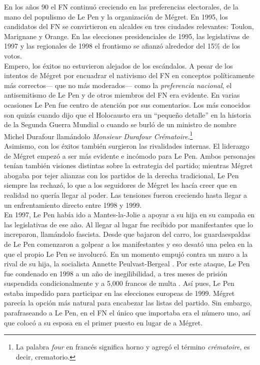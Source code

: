 En los años 90 el FN continuó creciendo en las preferencias electorales, de la mano del populismo de Le Pen y la organización de Mégret. En 1995, los candidatos del FN se convirtieron en alcaldes en tres ciudades relevantes: Toulon, Marignane y Orange. En las elecciones presidenciales de 1995, las legislativas de 1997 y las regionales de 1998 el frontismo se afianzó alrededor del 15\% de los votos.\\

Empero, los éxitos no estuvieron alejados de los escándalos. A pesar de los intentos de Mégret por encuadrar el nativismo del FN en conceptos políticamente más correctos--- que no más moderados--- como la \textit{preferencia nacional}, el antisemitismo de Le Pen y de otros miembros del FN era evidente. En varias ocasiones Le Pen fue centro de atención por sus comentarios. Los más conocidos son quizás cuando dijo que el Holocausto era un ``pequeño detalle'' en la historia de la Segunda Guerra Mundial o cuando se burló de un ministro de nombre Michel Durafour llamándolo \textit{Monsieur Durafour Crématoire}.\footnote{La palabra \textit{four} en francés significa horno y agregó el término \textit{crématoire}, es decir, crematorio.}\\ 

Asimismo, con los éxitos también surgieron las rivalidades internas. El liderazgo de Mégret empezó a ser más evidente e incómodo para Le Pen. Ambos personajes tenían también visiones distintas sobre la estrategia del partido;  mientras Mégret abogaba por tejer alianzas con los partidos de la derecha tradicional, Le Pen siempre las rechazó, lo que a los seguidores de Mégret les hacía creer que en realidad no quería llegar al poder. Las tensiones fueron creciendo hasta llegar a un enfrentamiento directo entre 1998 y 1999.\\ 

En 1997, Le Pen había ido a Mantes-la-Jolie a apoyar a su hija en su campaña en las legislativas de ese año. Al llegar al lugar fue recibido por manifestantes que lo increparon, llamándolo fascista. Desde que bajaron del carro, los guardaespaldas de Le Pen comenzaron a golpear a los manifestantes y eso desató una pelea en la que el propio Le Pen se involucró. En un momento empujó contra un muro a la rival de su hija, la socialista Annette Peulvast-Bergeal \parencite{InaPolitique97}. Por este ataque, Le Pen fue condenado en 1998 a un año de inegilibilidad, a tres meses de prisión suspendida condicionalmente y a 5,000 francos de multa \parencite{LesEchos99}. Así pues, Le Pen estaba impedido para participar en las elecciones europeas de 1999. Mégret parecía la opción más natural para encabezar las listas del partido. Sin embargo, parafraseando a Le Pen, en el FN el único que importaba era el número uno, así que colocó a su esposa en el primer puesto en lugar de a Mégret.\\ 

